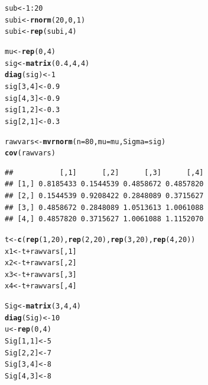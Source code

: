 \documentclass[11pt,a4paper,twoside]{book}
\makeatletter
\newcommand{\hlnum}[1]{\textcolor[rgb]{0.686,0.059,0.569}{#1}}%
\newcommand{\hlopt}[1]{\textcolor[rgb]{0,0,0}{#1}}%
\newcommand{\hlstd}[1]{\textcolor[rgb]{0.345,0.345,0.345}{#1}}%
\newcommand{\hlkwb}[1]{\textcolor[rgb]{0.69,0.353,0.396}{#1}}%
\newcommand{\hlkwc}[1]{\textcolor[rgb]{0.333,0.667,0.333}{#1}}%
\newcommand{\hlkwd}[1]{\textcolor[rgb]{0.737,0.353,0.396}{\textbf{#1}}}%
\newenvironment{kframe}{%
 \def\at@end@of@kframe{}%
 \ifinner\ifhmode%
  \def\at@end@of@kframe{\end{minipage}}%
  \begin{minipage}{\columnwidth}%
 \fi\fi%
 \def\FrameCommand##1{\hskip\@totalleftmargin \hskip-\fboxsep
 \colorbox{shadecolor}{##1}\hskip-\fboxsep
     \hskip-\linewidth \hskip-\@totalleftmargin \hskip\columnwidth}%
 \MakeFramed {\advance\hsize-\width
   \@totalleftmargin\z@ \linewidth\hsize
   \@setminipage}}%
 {\par\unskip\endMakeFramed%
 \at@end@of@kframe}
\newenvironment{knitrout}{}{} %
\makeatother
\begin{document}
\begin{knitrout}
\color{fgcolor}\begin{kframe}
\begin{alltt}
\hlstd{sub}\hlkwb{<-} \hlnum{1}\hlopt{:}\hlnum{20}
\hlstd{subi} \hlkwb{<-} \hlkwd{rnorm}\hlstd{(}\hlnum{20}\hlstd{,} \hlnum{0}\hlstd{,} \hlnum{1}\hlstd{)}
\hlstd{subi}\hlkwb{<-}\hlkwd{rep}\hlstd{(subi,} \hlnum{4}\hlstd{)}

\hlstd{mu} \hlkwb{<-} \hlkwd{rep}\hlstd{(}\hlnum{0}\hlstd{,}\hlnum{4}\hlstd{)}
\hlstd{sig} \hlkwb{<-} \hlkwd{matrix}\hlstd{(}\hlnum{0.4}\hlstd{,} \hlnum{4}\hlstd{,} \hlnum{4}\hlstd{)}
\hlkwd{diag}\hlstd{(sig)} \hlkwb{<-} \hlnum{1}
\hlstd{sig[}\hlnum{3}\hlstd{,}\hlnum{4}\hlstd{]} \hlkwb{<-} \hlnum{0.9}
\hlstd{sig[}\hlnum{4}\hlstd{,}\hlnum{3}\hlstd{]} \hlkwb{<-} \hlnum{0.9}
\hlstd{sig[}\hlnum{1}\hlstd{,}\hlnum{2}\hlstd{]} \hlkwb{<-} \hlnum{0.3}
\hlstd{sig[}\hlnum{2}\hlstd{,}\hlnum{1}\hlstd{]} \hlkwb{<-} \hlnum{0.3}

\hlstd{rawvars} \hlkwb{<-} \hlkwd{mvrnorm}\hlstd{(}\hlkwc{n}\hlstd{=}\hlnum{80}\hlstd{,} \hlkwc{mu}\hlstd{=mu,} \hlkwc{Sigma}\hlstd{=sig)}
\hlkwd{cov}\hlstd{(rawvars)}
\end{alltt}
\begin{verbatim}
##           [,1]      [,2]      [,3]      [,4]
## [1,] 0.8185433 0.1544539 0.4858672 0.4857820
## [2,] 0.1544539 0.9208422 0.2848089 0.3715627
## [3,] 0.4858672 0.2848089 1.0513613 1.0061088
## [4,] 0.4857820 0.3715627 1.0061088 1.1152070
\end{verbatim}
\begin{alltt}
\hlstd{t} \hlkwb{<-} \hlkwd{c}\hlstd{(}\hlkwd{rep}\hlstd{(}\hlnum{1}\hlstd{,} \hlnum{20}\hlstd{),}\hlkwd{rep}\hlstd{(}\hlnum{2}\hlstd{,}\hlnum{20}\hlstd{),} \hlkwd{rep}\hlstd{(}\hlnum{3}\hlstd{,} \hlnum{20}\hlstd{),} \hlkwd{rep}\hlstd{(}\hlnum{4}\hlstd{,} \hlnum{20}\hlstd{))}
\hlstd{x1} \hlkwb{<-} \hlstd{t}\hlopt{+}\hlstd{rawvars[,}\hlnum{1}\hlstd{]}
\hlstd{x2} \hlkwb{<-} \hlstd{t}\hlopt{+}\hlstd{rawvars[,}\hlnum{2}\hlstd{]}
\hlstd{x3} \hlkwb{<-} \hlstd{t}\hlopt{+}\hlstd{rawvars[,}\hlnum{3}\hlstd{]}
\hlstd{x4} \hlkwb{<-} \hlstd{t}\hlopt{+}\hlstd{rawvars[,}\hlnum{4}\hlstd{]}

\hlstd{Sig}\hlkwb{<-} \hlkwd{matrix}\hlstd{(}\hlnum{3}\hlstd{,} \hlnum{4}\hlstd{,}\hlnum{4}\hlstd{)}
\hlkwd{diag}\hlstd{(Sig)} \hlkwb{<-} \hlnum{10}
\hlstd{u} \hlkwb{<-} \hlkwd{rep}\hlstd{(}\hlnum{0}\hlstd{,} \hlnum{4}\hlstd{)}
\hlstd{Sig[}\hlnum{1}\hlstd{,}\hlnum{1}\hlstd{]} \hlkwb{<-} \hlnum{5}
\hlstd{Sig[}\hlnum{2}\hlstd{,}\hlnum{2}\hlstd{]} \hlkwb{<-} \hlnum{7}
\hlstd{Sig[}\hlnum{3}\hlstd{,}\hlnum{4}\hlstd{]} \hlkwb{<-} \hlnum{8}
\hlstd{Sig[}\hlnum{4}\hlstd{,}\hlnum{3}\hlstd{]} \hlkwb{<-} \hlnum{8}


\end{alltt}
\end{kframe}
\end{knitrout}
\end{document}
